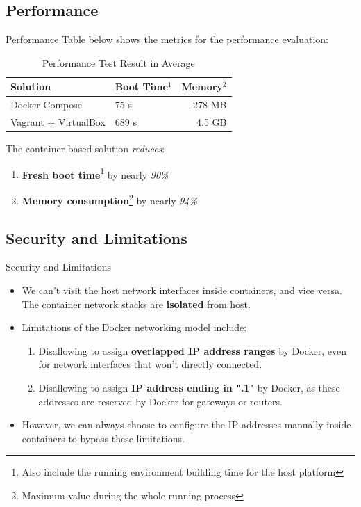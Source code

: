 \documentclass{beamer}
\begin{document}
\subsection{Performance}
\begin{frame}{Performance}
    Table below shows the metrics for the performance evaluation:
    \begin{table}[t!]
      \begin{center}
        \caption{Performance Test Result in Average}
        \begin{tabular}{|l|lr|}
        \hline
        Solution               & Boot Time$^1$ & Memory$^2$ \\
        \hline
        Docker Compose         &   75 s    &  278 MB \\
        Vagrant + VirtualBox   &  689 s    &  4.5 GB \\
        \hline
        \end{tabular}
        \label{tab:result}
      \end{center}
    \end{table}
    The container based solution \textit{reduces}:
    \begin{enumerate}
    \item \textbf{Fresh boot time}\footnote{Also include the running environment building time for the host platform} by nearly \textit{90\%}
    \item \textbf{Memory consumption}\footnote{Maximum value during the whole running process} by nearly \textit{94\%}
    \end{enumerate}
\end{frame}

\subsection{Security and Limitations}
\begin{frame}{Security and Limitations}
\begin{itemize}
\item We can't visit the host network interfaces inside containers, and vice versa. The container network stacks are \textbf{isolated} from host.
\end{itemize}

\begin{itemize}
\item Limitations of the Docker networking model include:
\begin{enumerate}
\item Disallowing to assign \textbf{overlapped IP address ranges} by Docker, even for network interfaces that won't directly connected.
\item Disallowing to assign \textbf{IP address ending in ".1"} by Docker, as these addresses are reserved by Docker for gateways or routers.
\end{enumerate}
\item However, we can always choose to configure the IP addresses manually inside containers to bypass these limitations.
\end{itemize}
\end{frame}
\end{document}
